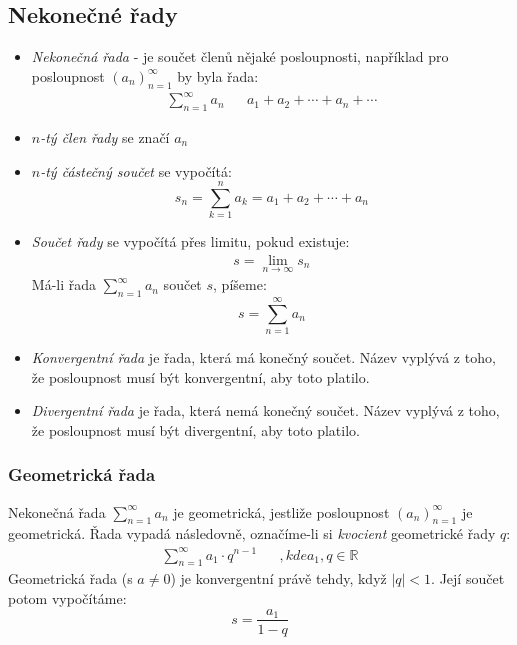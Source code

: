 \documentclass[12pt]{article}
\begin{document}
\subsection{Nekonečné řady}
\begin{itemize}
\item \emph{Nekonečná řada} - je součet členů nějaké posloupnosti, například pro posloupnost $(a_n)_{n=1}^{\infty}$ by byla řada:
\begin{align}
\sum_{n=1}^{\infty} a_n && a_1 + a_2 + \dotsb + a_n + \dotsb
\end{align}
\item \emph{$n$-tý člen řady} se značí $a_n$
\item \emph{$n$-tý částečný součet} se vypočítá:
\begin{equation}
s_n = \sum_{k=1}^n a_k = a_1 + a_2 + \dotsb + a_n
\end{equation}
\item \emph{Součet řady} se vypočítá přes limitu, pokud existuje:
\begin{align}
s = \lim_{n \to \infty} s_n
\end{align}
Má-li řada $\sum\limits_{n=1}^{\infty} a_n $ součet $s$, píšeme:
\begin{equation}
s = \sum\limits_{n=1}^{\infty} a_n
\end{equation}
\item \emph{Konvergentní řada} je řada, která má konečný součet. Název vyplývá z toho, že posloupnost musí být konvergentní, aby toto platilo.
\item \emph{Divergentní řada}  je řada, která nemá konečný součet. Název vyplývá z toho, že posloupnost musí být divergentní, aby toto platilo.
\end{itemize}
\subsubsection{Geometrická řada}
Nekonečná řada $\sum\limits_{n=1}^{\infty} a_n $ je geometrická, jestliže posloupnost $(a_n)_{n=1}^{\infty}$ je geometrická. Řada vypadá následovně, označíme-li si \emph{kvocient} geometrické řady $q$:
\begin{align}
\sum\limits_{n=1}^{\infty} a_1 \cdot q^{n-1} && ,kde a_1, q \in \mathbb{R}
\end{align}
Geometrická řada (s $a \neq 0$) je konvergentní právě tehdy, když $|q| <1$. Její součet potom vypočítáme:
\begin{equation}
s = \frac{a_1}{1-q}
\end{equation}
\end{document}
